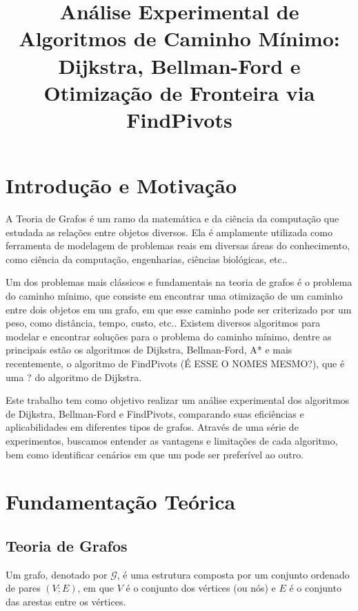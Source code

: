 \documentclass[10pt,a4paper]{article}
\title{\bfseries Análise Experimental de Algoritmos de Caminho Mínimo: Dijkstra, Bellman-Ford e Otimização de Fronteira via FindPivots}
\begin{document}
\maketitle




\section{Introdução e Motivação}

A Teoria de Grafos é um ramo da matemática e da ciência da computação que estudada as relações entre objetos diversos. Ela é amplamente utilizada como ferramenta de modelagem de problemas reais em diversas áreas do conhecimento, como ciência da computação, engenharias, ciências biológicas, etc..

Um dos problemas mais clássicos e fundamentais na teoria de grafos é o problema do caminho mínimo, que consiste em encontrar uma otimização de um caminho entre dois objetos em um grafo, em que esse caminho pode ser criterizado por um peso, como distância, tempo, custo, etc.. Existem diversos algoritmos para modelar e encontrar soluções para o problema do caminho mínimo, dentre as principais estão os algoritmos de Dijkstra, Bellman-Ford, A* e mais recentemente, o algoritmo de FindPivots (É ESSE O NOMES MESMO?), que é uma ? do algoritmo de Dijkstra.

Este trabalho tem como objetivo realizar um análise experimental dos algoritmos de Dijkstra, Bellman-Ford e FindPivots, comparando suas eficiências e aplicabilidades em diferentes tipos de grafos. Através de uma série de experimentos, buscamos entender as vantagens e limitações de cada algoritmo, bem como identificar cenários em que um pode ser preferível ao outro.


\section{Fundamentação Teórica}

\subsection{Teoria de Grafos}


Um grafo, denotado por $\mathcal{G}$, é uma estrutura composta por um conjunto ordenado de pares $\left(V;E\right) $, em que $V$ é o conjunto dos vértices (ou nós) e $E$ é o conjunto das arestas entre os vértices. 
\end{document}
